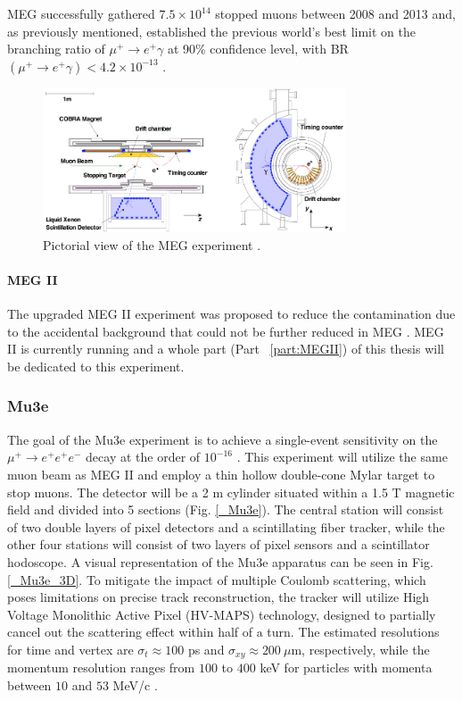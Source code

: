 \begin{refsection}
        MEG successfully gathered $7.5\times10^{14}$ stopped muons between 2008 and 2013 and, as previously mentioned, established the previous world's best limit on the branching ratio of $\mu^+\rightarrow e^+\gamma$ at 90\% confidence level, with BR$(\mu^+\rightarrow e^+\gamma)<4.2\times10^{-13}$ \cite{MEG}.

        \begin{figure}[h!]
            \centering
            \includegraphics[width=0.8\textwidth]{Figures/Introduction/MEG.png}
            \caption[MEG experiment]{Pictorial view of the MEG experiment \cite{Chiappini}\cite{MEG}.}
            \label{_MEG}
        \end{figure}

        \paragraph{MEG II} 
        The upgraded MEG II experiment was proposed to reduce the contamination due to the accidental background that could not be further reduced in MEG \cite{MEG_upgrade} \cite{MEG_II}.
        MEG II is currently running and a whole part (Part ~\ref{part:MEGII}) of this thesis will be dedicated to this experiment.        
        
        \subsubsection{Mu3e}
        The goal of the Mu3e experiment is to achieve a single-event sensitivity on the $\mu^+ \rightarrow e^+ e^+e^-$ decay at the order of $10^{-16}$ \cite{Mu3e:2016}. This experiment will utilize the same muon beam as MEG II and employ a thin hollow double-cone Mylar target to stop muons. The detector will be a 2 m cylinder situated within a 1.5 T magnetic field and divided into 5 sections (Fig. \ref{_Mu3e}). The central station will consist of two double layers of pixel detectors and a scintillating fiber tracker, while the other four stations will consist of two layers of pixel sensors and a scintillator hodoscope. A visual representation of the Mu3e apparatus can be seen in Fig. \ref{_Mu3e_3D}. To mitigate the impact of multiple Coulomb scattering, which poses limitations on precise track reconstruction, the tracker will utilize High Voltage Monolithic Active Pixel (HV-MAPS) technology, designed to partially cancel out the scattering effect within half of a turn. The estimated resolutions for time and vertex are $\sigma_t \approx 100$ ps and $\sigma_{xy} \approx 200\ \mu$m, respectively, while the momentum resolution ranges from $100$ to $400$ keV for particles with momenta between $10$ and $53$ MeV/c \cite{Signorelli}. 
        

\end{refsection}
